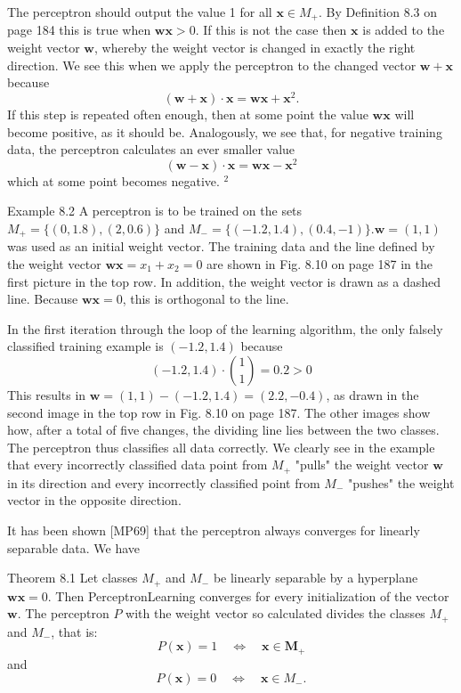 \documentclass[10pt]{book}
\begin{document}
The perceptron should output the value 1 for all $\boldsymbol{x} \in M_{+}$. By Definition 8.3 on page 184 this is true when $\boldsymbol{w} \boldsymbol{x}>0$. If this is not the case then $\boldsymbol{x}$ is added to the weight vector $\boldsymbol{w}$, whereby the weight vector is changed in exactly the right direction. We see this when we apply the perceptron to the changed vector $\boldsymbol{w}+\boldsymbol{x}$ because
\[
(\boldsymbol{w}+\boldsymbol{x}) \cdot \boldsymbol{x}=\boldsymbol{w} \boldsymbol{x}+\boldsymbol{x}^{2}.
\]
If this step is repeated often enough, then at some point the value $\boldsymbol{w} \boldsymbol{x}$ will become positive, as it should be. Analogously, we see that, for negative training data, the perceptron calculates an ever smaller value
\[
(\boldsymbol{w}-\boldsymbol{x}) \cdot \boldsymbol{x}=\boldsymbol{w} \boldsymbol{x}-\boldsymbol{x}^{2}
\]
which at some point becomes negative. ${ }^{2}$

Example 8.2 A perceptron is to be trained on the sets $M_{+}=\{(0,1.8),(2,0.6)\}$ and $M_{-}=\{(-1.2,1.4),(0.4,-1)\} . \boldsymbol{w}=(1,1)$ was used as an initial weight vector. The training data and the line defined by the weight vector $\boldsymbol{w} \boldsymbol{x}=x_{1}+x_{2}=0$ are shown in Fig. 8.10 on page 187 in the first picture in the top row. In addition, the weight vector is drawn as a dashed line. Because $\boldsymbol{w} \boldsymbol{x}=0$, this is orthogonal to the line.

In the first iteration through the loop of the learning algorithm, the only falsely classified training example is $(-1.2,1.4)$ because
\[
(-1.2,1.4) \cdot\binom{1}{1}=0.2>0
\]
This results in $\boldsymbol{w}=(1,1)-(-1.2,1.4)=(2.2,-0.4)$, as drawn in the second image in the top row in Fig. 8.10 on page 187. The other images show how, after a total of five changes, the dividing line lies between the two classes. The perceptron thus classifies all data correctly. We clearly see in the example that every incorrectly classified data point from $M_{+}$ "pulls" the weight vector $\boldsymbol{w}$ in its direction and every incorrectly classified point from $M_{-}$ "pushes" the weight vector in the opposite direction.

It has been shown [MP69] that the perceptron always converges for linearly separable data. We have

Theorem 8.1 Let classes $M_{+}$ and $M_{-}$ be linearly separable by a hyperplane $\boldsymbol{w} \boldsymbol{x}=0$. Then PerceptronLearning converges for every initialization of the vector $\boldsymbol{w}$. The perceptron $P$ with the weight vector so calculated divides the classes $M_{+}$ and $M_{-}$, that is:
\[
P(\boldsymbol{x})=1 \quad \Leftrightarrow \quad \boldsymbol{x} \in \boldsymbol{M}_{+}
\]
and
\[
P(\boldsymbol{x})=0 \quad \Leftrightarrow \quad \boldsymbol{x} \in M_{-} .
\]
\end{document}
